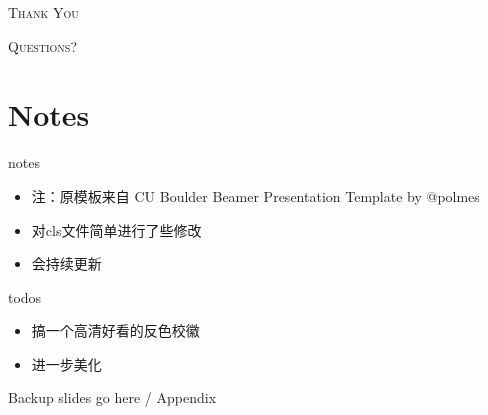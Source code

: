 \documentclass{cubeamer}
\begin{document}
\begin{frame}[standout]
    \Huge\textsc{Thank You }
    
    \vfill
    
    \LARGE\textsc{Questions?}
\end{frame}

\section{Notes}
\begin{frame}{notes}
\begin{itemize}
\item 注：原模板来自 CU Boulder Beamer Presentation Template by @polmes
\item 对cls文件简单进行了些修改
\item 会持续更新
\end{itemize}
\end{frame}

\begin{frame}{todos}
\begin{itemize}
\item 搞一个高清好看的反色校徽
\item 进一步美化
\end{itemize}
\end{frame}
\appendix

\begin{frame}{Backup slides go here / Appendix}

    
\end{frame}
\end{document}
